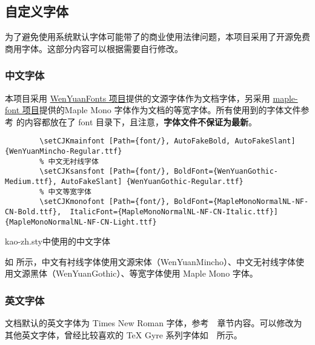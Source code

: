 \subsection{自定义字体}
为了避免使用系统默认字体可能带了的商业使用法律问题，本项目采用了开源免费商用字体。这部分内容可以根据需要自行修改。

\subsubsection{中文字体}

本项目采用 \href{https://github.com/takushun-wu/WenYuanFonts}{WenYuanFonts 项目}提供的文源字体作为文档字体，另采用 \href{https://github.com/subframe7536/maple-font}{maple-font 项目}提供的Maple Mono 字体作为文档的等宽字体。所有使用到的字体文件参考  的内容都放在了 font 目录下，且注意，\textbf{字体文件不保证为最新}。

\begin{listing}[H]
    \begin{verbatim}
        \setCJKmainfont [Path={font/}, AutoFakeBold, AutoFakeSlant] {WenYuanMincho-Regular.ttf}
        % 中文无衬线字体
        \setCJKsansfont [Path={font/}, BoldFont={WenYuanGothic-Medium.ttf}, AutoFakeSlant] {WenYuanGothic-Regular.ttf}
        % 中文等宽字体
        \setCJKmonofont [Path={font/}, BoldFont={MapleMonoNormalNL-NF-CN-Bold.ttf},  ItalicFont={MapleMonoNormalNL-NF-CN-Italic.ttf}] {MapleMonoNormalNL-NF-CN-Light.ttf}
    \end{verbatim}
    \caption{kao-zh.sty中使用的中文字体}
\end{listing}

如  所示，中文有衬线字体使用文源宋体（WenYuanMincho）、中文无衬线字体使用文源黑体（WenYuanGothic）、等宽字体使用 Maple Mono 字体。

\subsubsection{英文字体}

文档默认的英文字体为 Times New Roman 字体，参考~~章节内容。可以修改为其他英文字体，曾经比较喜欢的 TeX Gyre 系列字体如~~所示。

